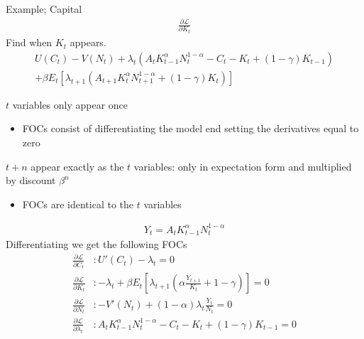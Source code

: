 \documentclass{beamer}
\begin{document}
\begin{frame}
Example; Capital
\begin{align}
    \frac{\partial \mathcal{L}}{\partial K_t}
  \end{align}
  Find when $K_t$ appears.
\begin{align}
  U(C_t)-V(N_t)+ \lambda_t(A_tK^\alpha_{t-1}N^{1-\alpha}_t -C_t -K_t + (1-\gamma)K_{t-1}) \\ \nonumber
  + \beta E_t[\lambda_{t+1}(A_{t+1}K^\alpha_{t}N^{1-\alpha}_{t+1}+(1-\gamma)K_t)]
\end{align}
\end{frame}


\begin{frame}
   $t$ variables only appear once
  \begin{itemize}
  \item FOCs consist of differentiating the model end setting the derivatives equal to zero  
\end{itemize}
$t+n$ appear exactly as the $t$ variables: only in expectation form and multiplied by discount $\beta^n$
\begin{itemize}
  \item FOCs are identical to the $t$ variables
\end{itemize}
\end{frame}

\begin{frame}
\begin{align}
  Y_t = A_tK^\alpha_{t-1}N^{1-\alpha}_t 
  \end{align}
  Differentiating we get the following FOCs
\begin{align}
  \frac{\partial \mathcal{L}}{\partial C_t}&: U'(C_t)-\lambda_t=0\\
  \frac{\partial \mathcal{L}}{\partial K_t}&: -\lambda_t + \beta E_t\left[\lambda_{t+1} \left( \alpha\frac{Y_{t+1}}{K_t}+1-\gamma \right) \right] =0\\
  \frac{\partial \mathcal{L}}{\partial N_t}&: -V'(N_t) + (1-\alpha) \lambda_t \frac{Y_t}{N_t}=0\\
  \frac{\partial \mathcal{L}}{\partial \lambda_t}&: A_tK^\alpha_{t-1}N^{1-\alpha}_t - C_t - K_t + (1-\gamma)K_{t-1} =0
\end{align}
\end{frame}
\end{document}
